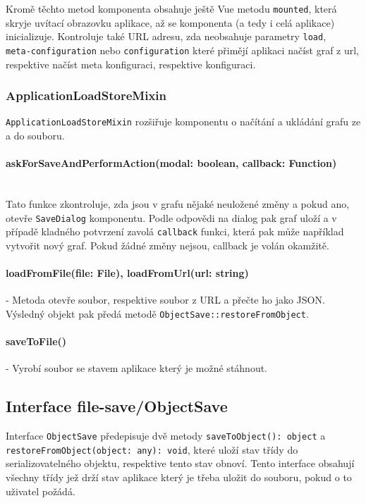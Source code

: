 Kromě těchto metod komponenta obsahuje ještě Vue metodu \texttt{mounted}, která skryje uvítací obrazovku aplikace, až se komponenta (a tedy i celá aplikace) inicializuje. Kontroluje také URL adresu, zda neobsahuje parametry \texttt{load}, \\ \texttt{meta-configuration} nebo \texttt{configuration} které přimějí aplikaci načíst graf z url, respektive načíst meta konfiguraci, respektive konfiguraci.

\subsubsection{ApplicationLoadStoreMixin}
\texttt{ApplicationLoadStoreMixin} rozšiřuje komponentu o načítání a ukládání grafu ze a do souboru.

\paragraph{askForSaveAndPerformAction(modal: boolean, callback: Function)}\mbox{}\\ Tato funkce zkontroluje, zda jsou v grafu nějaké neuložené změny a pokud ano, otevře \texttt{SaveDialog} komponentu. Podle odpovědi na dialog pak graf uloží a v případě kladného potvrzení zavolá \texttt{callback} funkci, která pak může například vytvořit nový graf. Pokud žádné změny nejsou, callback je volán okamžitě.

\paragraph{loadFromFile(file: File), loadFromUrl(url: string)} - Metoda otevře soubor, respektive soubor z URL a přečte ho jako JSON. Výsledný objekt pak předá metodě \texttt{ObjectSave::restoreFromObject}.

\paragraph{saveToFile()} - Vyrobí soubor se stavem aplikace který je možné stáhnout.

\subsection{Interface file-save/ObjectSave}
Interface \texttt{ObjectSave} předepisuje dvě metody \texttt{saveToObject(): object} a \texttt{restoreFromObject(object: any): void}, které uloží stav třídy do serializovatelného objektu, respektive tento stav obnoví. Tento interface obsahují všechny třídy jež drží stav aplikace který je třeba uložit do souboru, pokud o to uživatel požádá.

